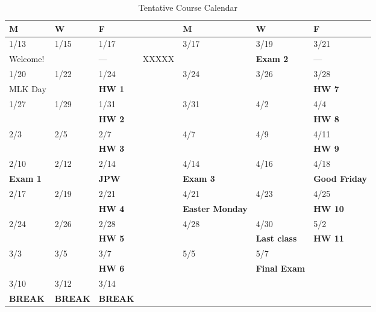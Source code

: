 \documentclass[11pt]{article}
\begin{document}
\begin{table}[htbp]
\caption{Tentative Course Calendar}
\centering
\begin{tabular}{lllllll}
\hline
M & W & F &  & M & W & F\\
\hline
1/13 & 1/15 & 1/17 &  & 3/17 & 3/19 & 3/21\\
Welcome! &  & --- & XXXXX &  & \textbf{Exam 2} & ---\\
\hline
1/20 & 1/22 & 1/24 &  & 3/24 & 3/26 & 3/28\\
MLK Day &  & \textbf{HW 1} &  &  &  & \textbf{HW 7}\\
\hline
1/27 & 1/29 & 1/31 &  & 3/31 & 4/2 & 4/4\\
 &  & \textbf{HW 2} &  &  &  & \textbf{HW 8}\\
\hline
2/3 & 2/5 & 2/7 &  & 4/7 & 4/9 & 4/11\\
 &  & \textbf{HW 3} &  &  &  & \textbf{HW 9}\\
\hline
2/10 & 2/12 & 2/14 &  & 4/14 & 4/16 & 4/18\\
\textbf{Exam 1} &  & \textbf{JPW} &  & \textbf{Exam 3} &  & \textbf{Good Friday}\\
\hline
2/17 & 2/19 & 2/21 &  & 4/21 & 4/23 & 4/25\\
 &  & \textbf{HW 4} &  & \textbf{Easter Monday} &  & \textbf{HW 10}\\
\hline
2/24 & 2/26 & 2/28 &  & 4/28 & 4/30 & 5/2\\
 &  & \textbf{HW 5} &  &  & \textbf{Last class} & \textbf{HW 11}\\
\hline
3/3 & 3/5 & 3/7 &  & 5/5 & 5/7 & \\
 &  & \textbf{HW 6} &  &  & \textbf{Final Exam} & \\
\hline
3/10 & 3/12 & 3/14 &  &  &  & \\
\textbf{BREAK} & \textbf{BREAK} & \textbf{BREAK} &  &  &  & \\
\hline
\end{tabular}
\end{table}
\end{document}
